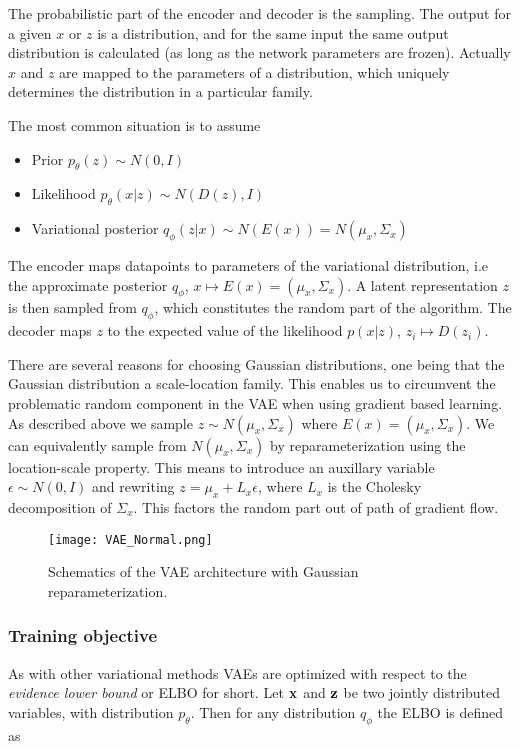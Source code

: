 \documentclass[../../thesis.tex]{subfiles}
\begin{document}
The probabilistic part of the encoder and decoder is the sampling. The output for a given $x$ or $z$ is a distribution, and for the same input the same output distribution is calculated (as long as the network parameters are frozen). Actually $x$ and $z$ are mapped to the parameters of a distribution, which uniquely determines the distribution in a particular family.\newline

The most common situation is to assume 
\begin{itemize}
    \item Prior $p_\theta(z)\sim N(0,I)$
    \item Likelihood $p_\theta(x|z)\sim N(D(z), I)$
    \item Variational posterior $q_\phi(z|x)\sim N(E(x)) = N(\mu_x, \Sigma_x)$
\end{itemize}
The encoder maps datapoints to parameters of the variational distribution, i.e the approximate posterior $q_\phi$, $x \mapsto E(x) = (\mu_x, \Sigma_x)$. A latent representation $z$ is then sampled from $q_\phi$, which constitutes the random part of the algorithm. The decoder maps $z$ to the expected value of the likelihood $p(x|z)$, $z_i \mapsto D(z_i)$. \newline

There are several reasons for choosing Gaussian distributions, one being that the Gaussian distribution a scale-location family. This enables us to circumvent the problematic random component in the VAE when using gradient based learning. As described above we sample $z\sim N(\mu_x,\Sigma_x)$ where $E(x) = (\mu_x,\Sigma_x)$. We can equivalently sample from $N(\mu_x,\Sigma_x)$ by reparameterization using the location-scale property. This means to introduce an auxillary variable $\epsilon \sim N(0,I)$ and rewriting $z = \mu_x + L_x\epsilon $, where $L_x$ is the Cholesky decomposition of $\Sigma_x$. This factors the random part out of path of gradient flow.
\begin{figure}[h]
    \texttt{[image: VAE\_Normal.png]}
    \centering
    \caption{Schematics of the VAE architecture with Gaussian reparameterization.}
    \label{fig:VAE_Normal}
\end{figure}


\subsubsection{Training objective}

As with other variational methods VAEs are optimized with respect to the \textit{evidence lower bound} or ELBO for short. Let $\mathbf{x}$ and $\mathbf{z}$ be two jointly distributed variables, with distribution $p_\theta$. Then for any distribution $q_\phi$ the ELBO is defined as
\end{document}
